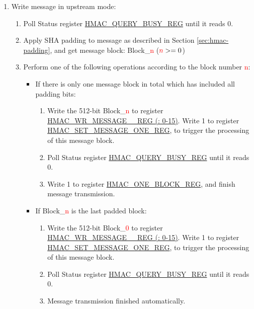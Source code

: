 \documentclass[main\_\_EN.tex]{subfiles}
\begin{document}
\begin{enumerate}
    \item Write message in upstream mode:
    \begin{enumerate}
        \item Poll Status register \hyperref[regdesc:HMACQUERYBUSYREG]{HMAC\_QUERY\_BUSY\_REG} until it reads 0.
        \item Apply SHA padding to message as described in Section \ref{sec:hmac-padding}, and get message block: Block\_\textcolor{red}{n} ($\textcolor{red}{n}>=0$)
        \item Perform one of the following operations according to the block number \textcolor{red}{n}:
        \begin{itemize}
            \item If there is only one message block in total which has included all padding bits:
            \begin{enumerate}
                \item Write the 512-bit Block\_\textcolor{red}{n} to register \hyperref[regdesc:HMACWRMESSAGENREG]
                {HMAC\_WR\_MESSAGE\_\_REG (: 0-15)}. Write 1 to register \hyperref[regdesc:HMACSETMESSAGEONEREG]{HMAC\_SET\_MESSAGE\_ONE\_REG}, to trigger the processing of this message block.
                \item Poll Status register \hyperref[regdesc:HMACQUERYBUSYREG]{HMAC\_QUERY\_BUSY\_REG} until it reads 0.
                \item Write 1 to register \hyperref[regdesc:HMACONEBLOCKREG]{HMAC\_ONE\_BLOCK\_REG}, and finish message transmission.
            \end{enumerate}
            \item If Block\_\textcolor{red}{n} is the last padded block:
            \begin{enumerate}
                \item Write the 512-bit Block\_\textcolor{red}{0} to register \hyperref[regdesc:HMACWRMESSAGENREG]
                {HMAC\_WR\_MESSAGE\_\_REG (: 0-15)}. Write 1 to register \hyperref[regdesc:HMACSETMESSAGEONEREG]{HMAC\_SET\_MESSAGE\_ONE\_REG}, to trigger the processing of this message block.
                \item Poll Status register \hyperref[regdesc:HMACQUERYBUSYREG]{HMAC\_QUERY\_BUSY\_REG} until it reads 0.
                \item Message transmission finished automatically.
            \end{enumerate}

\end{itemize}
\end{enumerate}
\end{enumerate}
\end{document}
